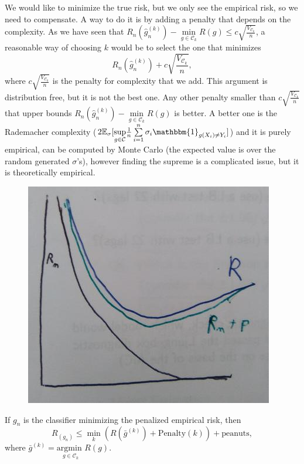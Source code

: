 \documentclass[11pt, english]{article}
\newcommand{\su}[2]{\sum\limits_{#1}^{#2}}
\begin{document}
We would like to minimize the true risk, but we only see the empirical risk, so we need to compensate. A way to do it is by adding a penalty that depends on the complexity. As we have seen that $R_n(\hat{g}_n^{(k)})-\underset{g\in \mathcal{C}_k}{\min}R(g)\leq c\sqrt{\frac{V_{\mathcal{C}_k}}{n}}$, a reasonable way of choosing $k$ would be to select the one that minimizes 
\begin{equation}
	R_n(\hat{g}_n^{(k)})+c\sqrt{\frac{V_{\mathcal{C}_k}}{n}},
\end{equation}
where $c\sqrt{\frac{V_{\mathcal{C}_k}}{n}}$ is the penalty for complexity that we add. This argument is distribution free, but it is not the best one. Any other penalty smaller than $c\sqrt{\frac{V_{\mathcal{C}_k}}{n}}$ that upper bounds $R_n(\hat{g}_n^{(k)})-\underset{g\in \mathcal{C}_k}{\min}R(g)$ is better. A better one is the Rademacher complexity ($2\mathbb{E}_{\sigma}[\underset{g\in\mathcal{C}}{\sup}\frac{1}{n}\su{i=1}{n}\sigma_i\mathbbm{1}_{g(X_i)\neq Y_i}]$) and it is purely empirical, can be computed by Monte Carlo (the expected value is over the random generated $\sigma$'s), however finding the supreme is a complicated issue, but it is theoretically empirical.
\begin{figure}
	[h!tbp]
	\centering
	\includegraphics[scale=0.3]{risk_comparison.jpg}
\end{figure}

If $g_n$ is the classifier minimizing the penalized empirical risk, then
\begin{equation}
	R_(g_n)\leq \underset{k}{\min}(R(\bar{g}^{(k)})+\text{Penalty}(k))+\text{peanuts},
\end{equation} 
where $\bar{g}^{(k)}=\underset{g\in\mathcal{C}_k}{\text{argmin }}R(g)$.
\end{document}
